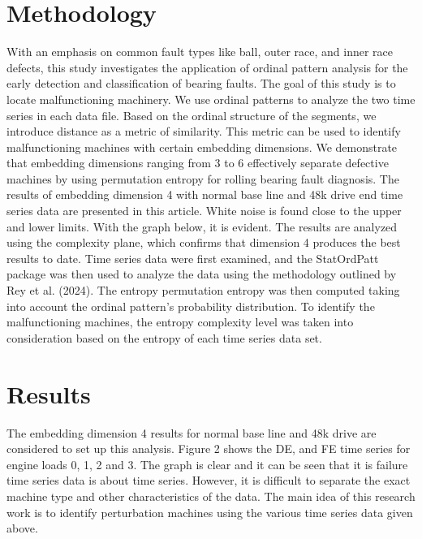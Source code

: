 \documentclass[a0,portrait]{a0poster}
\begin{document}
\begin{mdframed}[style=MyFrame]
\begin{multicols}{2}

\section{Methodology}\label{section2}

With an emphasis on common fault types like ball, outer race, and inner race defects, this study investigates the application of ordinal pattern analysis for the early detection and classification of bearing faults. The goal of this study is to locate malfunctioning machinery. We use ordinal patterns to analyze the two time series in each data file. Based on the ordinal structure of the segments, we introduce distance as a metric of similarity. This metric can be used to identify malfunctioning machines with certain embedding dimensions. We demonstrate that embedding dimensions ranging from 3 to 6 effectively separate defective machines by using permutation entropy for rolling bearing fault diagnosis. The results of embedding dimension 4 with normal base line and 48k drive end time series data are presented in this article. White noise is found close to the upper and lower limits. With the graph below, it is evident. The results are analyzed using the complexity plane, which confirms that dimension 4 produces the best results to date. Time series data were first examined, and the StatOrdPatt package was then used to analyze the data using the methodology outlined by Rey et al. (2024). The entropy permutation entropy was then computed taking into account the ordinal pattern's probability distribution. To identify the malfunctioning machines, the entropy complexity level was taken into consideration based on the entropy of each time series data set.

\section{Results}\label{section3}
The embedding dimension 4 results for normal base line and 48k drive are considered to set up this analysis. Figure 2 shows the DE, and FE time series for engine loads 0, 1, 2 and 3. The graph is clear and it can be seen that it is failure time series data is about time series. However, it is difficult to separate the exact machine type and other characteristics of the data. The main idea of this research work is to identify perturbation machines using the various time series data given above. 


\end{multicols}
\end{mdframed}
\end{document}
